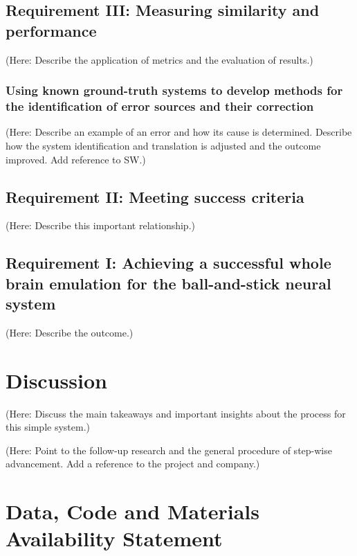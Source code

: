 \documentclass{ldr-article}
\begin{document}
\subsection{Requirement III: Measuring similarity and performance}

(Here: Describe the application of metrics and the evaluation of results.)

\subsubsection{Using known ground-truth systems to develop methods for the identification of error sources and their correction}

(Here: Describe an example of an error and how its cause is determined. Describe how the system identification and translation is adjusted and the outcome improved. Add reference to SW.)

\subsection{Requirement II: Meeting success criteria}

(Here: Describe this important relationship.)

\subsection{Requirement I: Achieving a successful whole brain emulation for the ball-and-stick neural system}

(Here: Describe the outcome.)

\section{Discussion}

(Here: Discuss the main takeaways and important insights about the process for this simple system.)

(Here: Point to the follow-up research and the general procedure of step-wise advancement. Add a reference to the project and company.)


\section{Data, Code and Materials Availability Statement}
\end{document}
